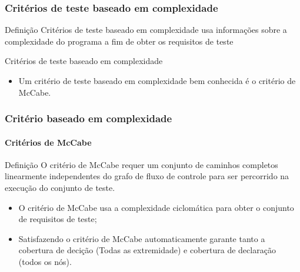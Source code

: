 \begin{frame}[parent={cmap:structural-software-testing},hasnext=true,hasprev=true]
\frametitle{Critérios de teste baseado em complexidade}
\label{concept:complexity-based-test-criterion}

\begin{block:concept}{Definição}
Critérios de teste baseado em complexidade usa informações sobre a complexidade do programa
a fim de obter os requisitos de teste
\end{block:concept}

\begin{block:fact}{Critérios de teste baseado em complexidade}
\begin{itemize}
	\item Um critério de teste baseado em complexidade bem conhecida é
	o critério de McCabe.
\end{itemize}
\end{block:fact}
\end{frame}


\begin{frame}
\label{concept:mccabe-criterion}
\frametitle{Critério baseado em complexidade}
\framesubtitle{Critérios de McCabe}

\begin{block:concept}{Definição}
O critério de McCabe requer um conjunto de caminhos completos linearmente independentes
do grafo de fluxo de controle para ser percorrido na execução do conjunto de teste.
\end{block:concept}

\begin{block:fact}{}
\begin{itemize}
	\item O critério de McCabe usa a complexidade ciclomática para obter o
	conjunto de requisitos de teste;

	\item Satisfazendo o critério de McCabe automaticamente garante tanto a
	cobertura de decição (Todas as extremidade) e cobertura de declaração (todos os nós).
\end{itemize}
\end{block:fact}
\end{frame}



